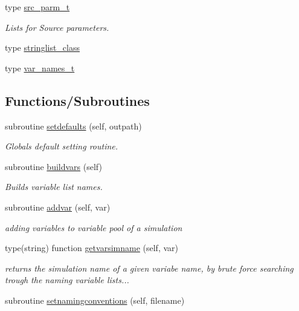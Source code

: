 \begin{DoxyCompactItemize}
type \mbox{\hyperlink{structsimulationglobals__mod_1_1src__parm__t}{src\+\_\+parm\+\_\+t}}
\begin{DoxyCompactList}\small\item\em Lists for Source parameters. \end{DoxyCompactList}\item 
type \mbox{\hyperlink{structsimulationglobals__mod_1_1stringlist__class}{stringlist\+\_\+class}}
\item 
type \mbox{\hyperlink{structsimulationglobals__mod_1_1var__names__t}{var\+\_\+names\+\_\+t}}
\end{DoxyCompactItemize}
\subsection*{Functions/\+Subroutines}
\begin{DoxyCompactItemize}
\item 
subroutine \mbox{\hyperlink{namespacesimulationglobals__mod_aa01e0a958ef2e94a02991dcfe390bfa0}{setdefaults}} (self, outpath)
\begin{DoxyCompactList}\small\item\em Globals default setting routine. \end{DoxyCompactList}\item 
subroutine \mbox{\hyperlink{namespacesimulationglobals__mod_a4aa829af1699c705e46f47bb023ac162}{buildvars}} (self)
\begin{DoxyCompactList}\small\item\em Builds variable list names. \end{DoxyCompactList}\item 
subroutine \mbox{\hyperlink{namespacesimulationglobals__mod_afd372c5764a180f9029d4dc3cddce94d}{addvar}} (self, var)
\begin{DoxyCompactList}\small\item\em adding variables to variable pool of a simulation \end{DoxyCompactList}\item 
type(string) function \mbox{\hyperlink{namespacesimulationglobals__mod_ac83c53dd4e998e653981c7b1fa5dacbd}{getvarsimname}} (self, var)
\begin{DoxyCompactList}\small\item\em returns the simulation name of a given variabe name, by brute force searching trough the naming variable lists... \end{DoxyCompactList}\item 
subroutine \mbox{\hyperlink{namespacesimulationglobals__mod_affd52c4c7b1c3f7ce282eeb7e4b4a359}{setnamingconventions}} (self, filename)

\end{DoxyCompactItemize}
